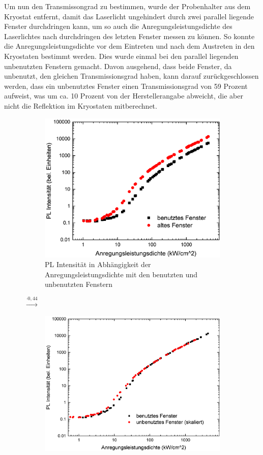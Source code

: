 Um nun den Transmissongrad zu bestimmen, wurde der Probenhalter aus dem Kryostat entfernt, damit das Laserlicht ungehindert durch zwei parallel liegende Fenster durchdringen kann, um so auch die Anregungsleistungsdichte des Laserlichtes nach durchdringen des letzten Fenster messen zu können. So konnte die Anregungsleistungsdichte vor dem Eintreten und nach dem Austreten in den Kryostaten bestimmt werden. 
Dies wurde einmal bei den parallel liegenden unbenutzten Fenstern gemacht. Davon ausgehend, dass beide Fenster, da unbenutzt, den gleichen Transmissionsgrad haben, kann darauf zurückgeschlossen werden, dass ein unbenutztes Fenster einen Transmissionsgrad von 59 Prozent aufweist, was um ca. 10 Prozent von der Herstellerangabe abweicht, die aber nicht die Reflektion im Kryostaten mitberechnet. 
%
\begin{figure}[htb]
  \centering
  \begin{subfigure}{0.40\textwidth}
    \centering
    \includegraphics[width=0.9\linewidth]{Bilder/uvsilicavergleich.pdf}
    \caption{PL Intensität in Abhängigkeit der Anregungsleistungsdichte mit den benutzten und unbenutzten Fenstern}
    \label{fig:sub1}
  \end{subfigure}%
  {\LARGE$\xrightarrow{\cdot 0,44}$}
  \begin{subfigure}{0.40\textwidth}
    \centering
    \includegraphics[width=0.9\linewidth]{Bilder/uvsilicaVergleichSkaliert.pdf}

\end{subfigure}
\end{figure}
